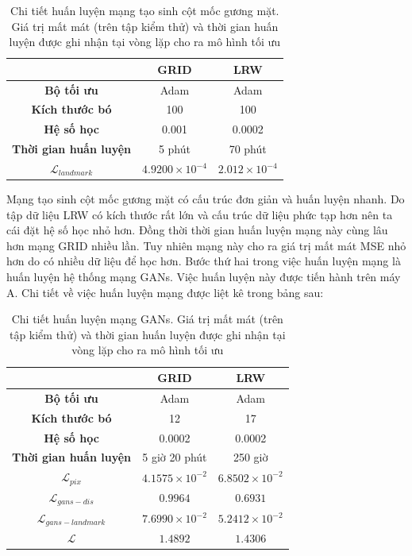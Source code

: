 \begin{table}[h]
    \centering
    \begin{tabular}{c | c | c}
    \hline 
    &\textbf{GRID} & \textbf{LRW}\\
    \hline
    \textbf{Bộ tối ưu} & Adam & Adam\\
    \textbf{Kích thước bó} & 100 & 100\\
    \textbf{Hệ số học} & 0.001 & 0.0002\\
    \textbf{Thời gian huấn luyện} & 5 phút & 70 phút\\
    \textbf{$\mathcal{L}_{landmark}$} & $4.9200 \times 10^{-4}$ & $2.012 \times 10^{-4}$\\
    \hline
    \end{tabular}
    \caption{Chi tiết huấn luyện mạng tạo sinh cột mốc gương mặt. Giá trị mất mát (trên tập kiểm thử) và thời gian huấn luyện được ghi nhận tại vòng lặp cho ra mô hình tối ưu}
    \label{table:landmark_decoder_training_detail}
\end{table}

Mạng tạo sinh cột mốc gương mặt có cấu trúc đơn giản và huấn luyện nhanh. Do tập dữ liệu LRW có kích thước rất lớn và cấu trúc dữ liệu phức tạp hơn nên ta cái đặt hệ số học nhỏ hơn. Đồng thời thời gian huấn luyện mạng này cùng lâu hơn mạng GRID nhiều lần. Tuy nhiên mạng này cho ra giá trị mất mát MSE nhỏ hơn do có nhiều dữ liệu để học hơn. Bước thứ hai trong việc huấn luyện mạng là huấn luyện hệ thống mạng GANs. Việc huấn luyện này được tiến hành trên máy A. Chi tiết về việc huấn luyện mạng được liệt kê trong bảng sau:

\begin{table}[h]
    \centering
    \begin{tabular}{c | c | c}
    \hline 
    &\textbf{GRID} & \textbf{LRW}\\
    \hline
    \textbf{Bộ tối ưu} & Adam & Adam\\
    \textbf{Kích thước bó} & 12 & 17\\
    \textbf{Hệ số học} & 0.0002 & 0.0002\\
    \textbf{Thời gian huấn luyện} & 5 giờ 20 phút & 250 giờ\\
    \textbf{$\mathcal{L}_{pix}$} & $4.1575 \times 10^{-2}$ & $6.8502 \times 10^{-2}$\\
    \textbf{$\mathcal{L}_{gans-dis}$} & $0.9964$ & $0.6931$\\
    \textbf{$\mathcal{L}_{gans-landmark}$} & $7.6990 \times 10^{-2}$ & $5.2412 \times 10^{-2}$\\
    \textbf{$\mathcal{L}$} & $1.4892$ & $1.4306$\\
    \hline
    \end{tabular}
    \caption{Chi tiết huấn luyện mạng GANs. Giá trị mất mát (trên tập kiểm thử) và thời gian huấn luyện được ghi nhận tại vòng lặp cho ra mô hình tối ưu}
    \label{table:gans_training_detail}
\end{table}

